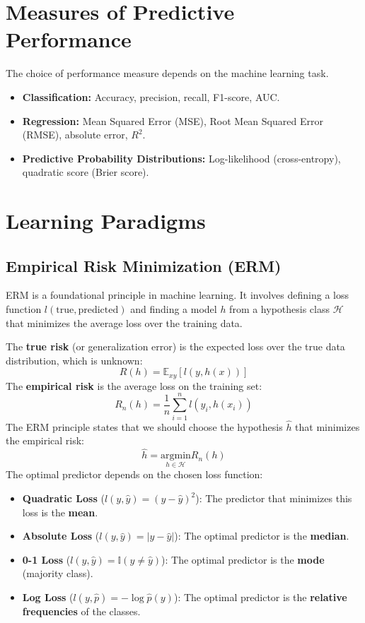 \documentclass{article}
\begin{document}
\begin{multicols}{2}
	\section{Measures of Predictive Performance}
	The choice of performance measure depends on the machine learning task.
	\begin{itemize}
		\item \textbf{Classification:} Accuracy, precision, recall, F1-score, AUC.
		\item \textbf{Regression:} Mean Squared Error (MSE), Root Mean Squared Error (RMSE), absolute error, $R^2$.
		\item \textbf{Predictive Probability Distributions:} Log-likelihood (cross-entropy), quadratic score (Brier score).
	\end{itemize}

	\section{Learning Paradigms}
	\subsection{Empirical Risk Minimization (ERM)}
	ERM is a foundational principle in machine learning. It involves defining a loss function $l(\text{true}, \text{predicted})$ and finding a model $h$ from a hypothesis class $\mathcal{H}$ that minimizes the average loss over the training data.

	The \textbf{true risk} (or generalization error) is the expected loss over the true data distribution, which is unknown:
	$$ R(h) = \mathbb{E}_{xy}[l(y, h(x))] $$
	The \textbf{empirical risk} is the average loss on the training set:
	$$ R_n(h) = \frac{1}{n} \sum_{i=1}^{n} l(y_i, h(x_i)) $$
	The ERM principle states that we should choose the hypothesis $\hat{h}$ that minimizes the empirical risk:
	$$ \hat{h} = \underset{h \in \mathcal{H}}{\text{argmin}} R_n(h) $$
	The optimal predictor depends on the chosen loss function:
	\begin{itemize}
		\item \textbf{Quadratic Loss} ($l(y, \hat{y}) = (y - \hat{y})^2$): The predictor that minimizes this loss is the \textbf{mean}.
		\item \textbf{Absolute Loss} ($l(y, \hat{y}) = |y - \hat{y}|$): The optimal predictor is the \textbf{median}.
		\item \textbf{0-1 Loss} ($l(y, \hat{y}) = \mathbb{I}(y \neq \hat{y})$): The optimal predictor is the \textbf{mode} (majority class).
		\item \textbf{Log Loss} ($l(y, \hat{p}) = -\log \hat{p}(y)$): The optimal predictor is the \textbf{relative frequencies} of the classes.
	\end{itemize}


\end{multicols}
\end{document}
